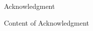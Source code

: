 \newpage
\begin{center}
  \LARGE


    
  Acknowledgment \\[0.5cm]	
\end{center}

\normalsize
Content of Acknowledgment